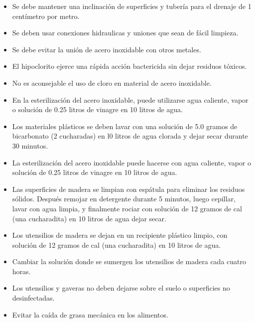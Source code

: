 \documentclass{article}%
\begin{document}
\begin{large}
\begin{itemize}
\begin{itemize}
\item%
Se debe mantener una inclinación de superficies y tubería para el drenaje de 1 centímetro por metro.%
\item%
Se deben usar conexiones hidraulicas y uniones que sean de fácil limpieza.%
\item%
Se debe evitar la unión de acero inoxidable con otros metales.%
\item%
El hipoclorito ejerce una rápida acción bactericida sin dejar residuos tóxicos.%
\item%
No es aconsejable el uso de cloro en material de acero inoxidable.%
\item%
En la esterilización del acero inoxidable, puede utilizarse agua caliente, vapor o solución de 0.25 litros de vinagre en 10 litros de agua.%
\item%
Los materiales plásticos se deben lavar con una solución de 5.0 gramos de bicarbonato (2 cucharadas) en l0 litros de agua clorada y dejar secar durante 30 minutos.%
\item%
La esterilización del acero inoxidable puede hacerse con agua caliente, vapor o solución de 0.25 litros de vinagre en 10 litros de agua.%
\item%
Las superficies de madera se limpian con espátula para eliminar los residuos sólidos. Después remojar en detergente durante 5 minutos, luego cepillar, lavar con agua limpia, y finalmente rociar con solución de 12 gramos de cal (una cucharadita) en 10 litros de agua dejar secar.%
\item%
Los utensilios de madera se dejan en un recipiente plástico limpio, con solución de 12 gramos de cal (una cucharadita) en 10 litros de agua.%
\item%
Cambiar la solución donde se sumergen los utensilios de madera cada cuatro horas.%
\item%
Los utensilios y gaveras no deben dejarse sobre el suelo o superficies no desinfectadas.%
\item%
Evitar la caída de grasa mecánica en los alimentos.%
\end{itemize}%
\end{itemize}%
\end{large}%
\newpage%
\end{document}
